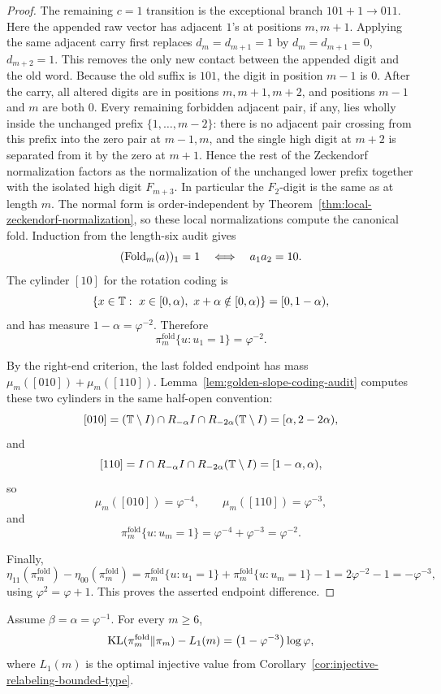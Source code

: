 \begin{proof}
  The remaining \(c=1\) transition is the exceptional branch
  \(101+1\to011\).  Here the appended raw vector has adjacent \(1\)'s at
  positions \(m,m+1\).  Applying the same adjacent carry first replaces
  \(d_m=d_{m+1}=1\) by \(d_m=d_{m+1}=0\), \(d_{m+2}=1\).  This removes the only
  new contact between the appended digit and the old word.  Because the old
  suffix is \(101\), the digit in position \(m-1\) is \(0\).  After the carry,
  all altered digits are in positions \(m,m+1,m+2\), and positions \(m-1\) and
  \(m\) are both \(0\).  Every remaining forbidden adjacent pair, if any, lies
  wholly inside the unchanged prefix \(\{1,\ldots,m-2\}\): there is no adjacent
  pair crossing from this prefix into the zero pair at \(m-1,m\), and the single
  high digit at \(m+2\) is separated from it by the zero at \(m+1\).  Hence the
  rest of the Zeckendorf normalization factors as the normalization of the
  unchanged lower prefix together with the isolated high digit \(F_{m+3}\).
  In particular the \(F_2\)-digit is the same as at length \(m\).
  The normal form is order-independent by
  Theorem~\ref{thm:local-zeckendorf-normalization}, so these local
  normalizations compute the canonical fold.  Induction from the length-six
  audit gives
  \[
  (\mathrm{Fold}_m(a))_1=1
  \quad\Longleftrightarrow\quad
  a_1a_2=10.
\]
The cylinder \([10]\) for the rotation coding is
\[
\{x\in\TT:\ x\in[0,\alpha),\ x+\alpha\notin[0,\alpha)\}
=
[0,1-\alpha),
\]
and has measure \(1-\alpha=\varphi^{-2}\). Therefore
\[
\pi_m^{\mathrm{fold}}\{u:u_1=1\}=\varphi^{-2}.
\]

By the right-end criterion, the last folded endpoint has mass
\(\mu_m([010])+\mu_m([110])\).  Lemma~\ref{lem:golden-slope-coding-audit}
computes these two cylinders in the same half-open convention:
\[
[010]=(\mathbb{T}\setminus I)\cap R_{-\alpha}I\cap R_{-2\alpha}(\mathbb{T}\setminus I)
=[\alpha,2-2\alpha),
\]
and
\[
[110]=I\cap R_{-\alpha}I\cap R_{-2\alpha}(\mathbb{T}\setminus I)
=[1-\alpha,\alpha),
\]
so
\[
\mu_m([010])=\varphi^{-4},
\qquad
\mu_m([110])=\varphi^{-3},
\]
and
\[
\pi_m^{\mathrm{fold}}\{u:u_m=1\}
=
\varphi^{-4}+\varphi^{-3}
=
\varphi^{-2}.
\]

Finally,
\[
\eta_{11}(\pi_m^{\mathrm{fold}})
-
\eta_{00}(\pi_m^{\mathrm{fold}})
=
\pi_m^{\mathrm{fold}}\{u:u_1=1\}
+
\pi_m^{\mathrm{fold}}\{u:u_m=1\}
-
1
=
2\varphi^{-2}-1
=
-\varphi^{-3},
\]
using \(\varphi^2=\varphi+1\).  This proves the asserted endpoint difference.
\end{proof}

\begin{proposition}
\label{prop:canonical-golden-slope-gap}
Assume \(\beta=\alpha=\varphi^{-1}\).  For every \(m\ge6\),
\[
\operatorname{KL}(\pi_m^{\mathrm{fold}}\|\pi_m)-L_1(m)
=
\bigl(1-\varphi^{-3}\bigr)\log\varphi,
\]
where \(L_1(m)\) is the optimal injective value from
Corollary~\ref{cor:injective-relabeling-bounded-type}.
\end{proposition}

